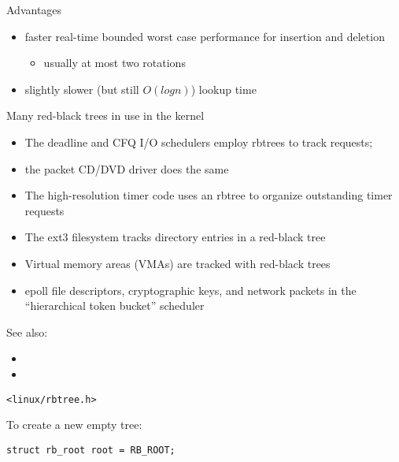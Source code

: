 \begin{frame}
  \begin{block}{Advantages}
    \begin{itemize}
    \item faster real-time bounded worst case performance for insertion and deletion
      \begin{itemize}
      \item usually at most two rotations%
      \end{itemize}
    \item slightly slower (but still $O(log n)$) lookup time
    \end{itemize}
  \end{block}
  \begin{block}{Many red-black trees in use in the kernel}
    \begin{itemize}
    \item The deadline and CFQ I/O schedulers employ rbtrees to track requests;
    \item the packet CD/DVD driver does the same
    \item The high-resolution timer code uses an rbtree to organize outstanding timer
      requests
    \item The ext3 filesystem tracks directory entries in a red-black tree
    \item Virtual memory areas (VMAs) are tracked with red-black trees
    \item epoll file descriptors, cryptographic keys, and network packets in the
      ``hierarchical token bucket'' scheduler
    \end{itemize}
  \end{block}
\end{frame}

See also:
\begin{itemize}
\item {}
\item {}
\end{itemize}

\begin{frame}[fragile=singleslide]
  \begin{block}{\texttt{<linux/rbtree.h>}}
    \begin{center}
    \end{center}
  \end{block}
  To create a new empty tree:
  \begin{center}
    \texttt{struct rb_root root = RB_ROOT;}
  \end{center}
\end{frame}


